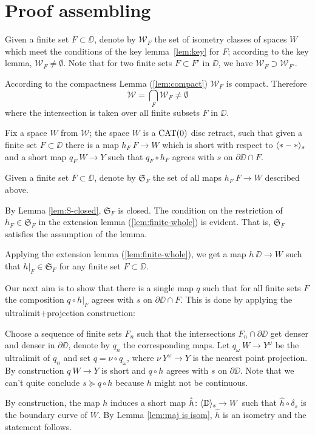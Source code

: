 \section{Proof assembling}\label{Main theorem}



Given a finite set $F\subset \DD$,
denote by $\mathcal{W}_F$
the set of isometry classes of spaces $W$ which meet the conditions of the key lemma~\ref{lem:key}
for $F$;
according to the key lemma, $\mathcal{W}_F\ne\emptyset$.
Note that for two finite sets $F\subset F'$ in $\DD$,
we have $\mathcal{W}_F\supset \mathcal{W}_{F'}$.

According to the compactness Lemma (\ref{lem:compact}) $\mathcal{W}_F$ is compact.
Therefore 
\[\mathcal{W}
=
\bigcap_{F}\mathcal{W}_F\ne \emptyset\]
where the intersection is taken over all finite subsets $F$ in $\DD$. 


Fix a space $W$ from $\mathcal{W}$;
the space $W$ is a $\mathop{\rm CAT}\nolimits(0)$ disc retract,
such that given a finite set $F\subset \DD$ there is a map $h_F\:F\to W$ which is short with 
respect to $\langle{*}-{*}\rangle_s$ 
and a short map $q_F\:W\to Y$ such that $q_F\circ h_F$ agrees with $s$ on $\partial\DD\cap F$.

Given a finite set $F\subset \DD$,
denote by $\mathfrak{S}_F$ the set of all maps $h_F\:F\to W$ described above.

By Lemma \ref{lem:S-closed}, $\mathfrak{S}_F$ is closed.
The condition on the restriction of $h_F\in  \mathfrak{S}_F$ in the extension lemma (\ref{lem:finite-whole}) is evident.
That is, $\mathfrak{S}_F$ satisfies the assumption of the lemma.

Applying the extension lemma (\ref{lem:finite-whole}),
we get a map $h\:\DD\to W$ such that $h|_F\in \mathfrak{S}_F$
for any finite set $F\subset \DD$.

Our next aim is to show that there is a single map $q$ such that
for all finite sets $F$ the composition $q\circ h|_F$ agrees with
$s$ on $\partial\DD\cap F$.
This is done by applying the ultralimit+projection construction:

Choose a sequence of finite sets $F_n$ such that the intersections $F_n\cap\partial \DD$ get denser and denser in $\partial \DD$, 
denote by $q_n$ the corresponding maps.
Let $q_\omega\:W\to Y^\omega$ be the ultralimit of $q_n$ and set $q=\nu\circ q_\omega$,
where $\nu\:Y^\omega\to Y$ is the nearest point projection.
By construction $q\:W\to Y$ is short and $q\circ h$ agrees with $s$ on $\partial \DD$.
Note that we can't quite conclude $s\succcurlyeq q\circ h$ because $h$ might not be continuous.

By construction, the map $h$ induces a short map $\hat h\colon\langle\mathbb{D}\rangle_s\to W$ 
such that $\hat h\circ\delta_s$ is the boundary curve of $W$.
By Lemma \ref{lem:maj is isom}, $\hat h$ is an isometry and the statement follows.
\qeds